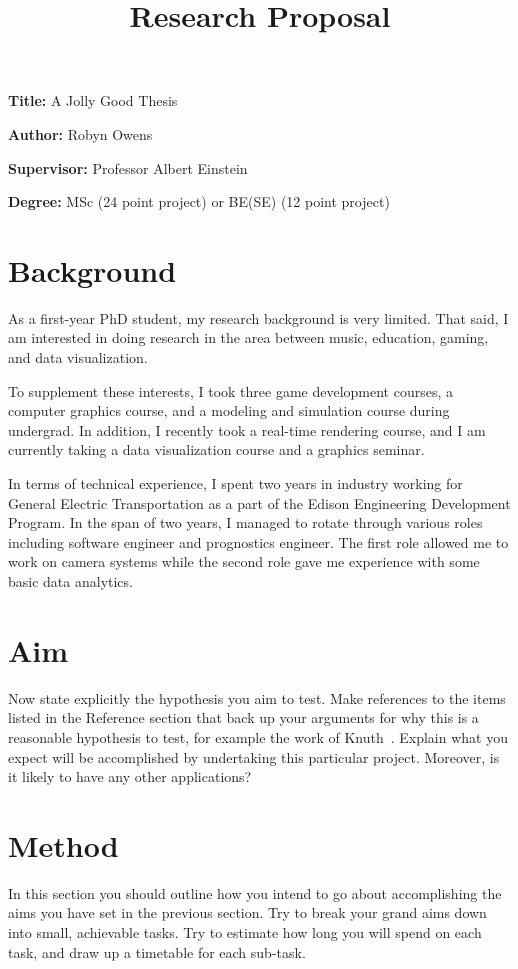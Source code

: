 \documentclass[12pt, a4paper]{article}
\title{Research Proposal}
\author{}
\date{}
\newcommand{\namelistlabel}[1]{\mbox{#1}\hfil}
\newenvironment{namelist}[1]{%
\begin{list}{}
    {
        \let\makelabel\namelistlabel
        \settowidth{\labelwidth}{#1}
        \setlength{\leftmargin}{1.1\labelwidth}
    }
  }{%
\end{list}}
\begin{document}
\maketitle

\begin{namelist}{xxxxxxxxxxxx}
\item[{\bf Title:}]
	A Jolly Good Thesis
\item[{\bf Author:}]
	Robyn Owens
\item[{\bf Supervisor:}]
	Professor Albert Einstein
\item[{\bf Degree:}]
	MSc (24 point project) or BE(SE) (12 point project)
\end{namelist}

\section*{Background}

As a first-year PhD student, my research background is very limited. That said,
I am interested in doing research in the area between music, education, gaming,
and data visualization.

To supplement these interests, I took three game development courses, a
computer graphics course, and a modeling and simulation course during undergrad.
In addition, I recently took a real-time rendering course, and I am
currently taking a data visualization course and a graphics seminar.

In terms of technical experience, I spent two years in industry working for
General Electric Transportation as a part of the Edison Engineering Development
Program. In the span of two years, I managed to rotate through various roles
including software engineer and prognostics engineer. The first role allowed
me to work on camera systems while the second role gave me experience with
some basic data analytics. 

\section*{Aim} Now state explicitly the hypothesis you aim to
test. Make references to the items listed in the Reference section
that back up your arguments for why this is a reasonable
hypothesis to test, for example the work of Knuth~\cite{knuth}.
Explain what you expect will be accomplished by undertaking this
particular project.  Moreover, is it likely to have any other
applications?

\section*{Method}
In this section you should outline how you intend to go
about accomplishing the aims you have set in the previous
section. Try to break your grand aims down into small,
achievable tasks. Try to estimate how long you will
spend on each task, and draw up a timetable for each
sub-task.
\end{document}
